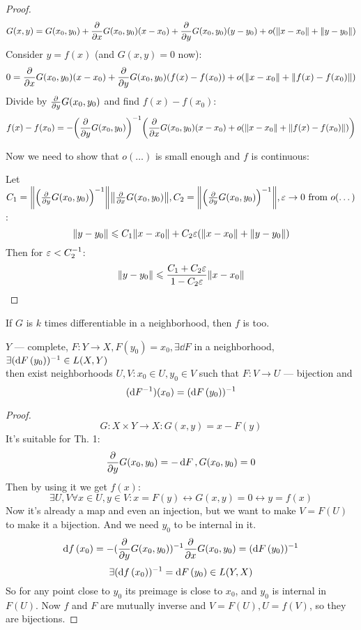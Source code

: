 \begin{proof}
    \[ G(x, y) = G(x_0, y_0) + \pdv{x}G(x_0, y_0)(x-x_0) + \pdv{y}G(x_0, y_0)(y - y_0) + o\qty(\norm{x - x_0} + \norm{y - y_0}) \]
    Consider $y = f(x)$ (and $G(x, y) = 0$ now):
    \[ 0 = \pdv{x}G(x_0, y_0)(x-x_0) + \pdv{y}G(x_0, y_0)\qty(f(x) - f(x_0)) + o\qty(\norm{x - x_0} + \norm{f(x) - f(x_0)}) \] 
    Divide by $\pdv{y}G(x_0, y_0)$ and find $f(x) - f(x_0)$:
    \[ f(x) - f(x_0) = -\qty(\pdv{y}G(x_0, y_0))^{-1} \qty(\pdv{x}G(x_0, y_0) (x - x_0) + o\qty(\norm{x - x_0} + \norm{f(x) - f(x_0)})) \] 

    Now we need to show that $o(\dots)$ is small enough and $f$ is continuous:

    Let $C_1 = \norm{\qty(\pdv{y}G(x_0, y_0))^{-1}} \norm{\pdv{x}G(x_0, y_0)}, C_2 = \norm{\qty(\pdv{y}G(x_0, y_0))^{-1}}, \varepsilon \to 0 \text{ from } o(\dots)$:
    \[ \norm{y - y_0} \leqslant C_1 \norm{x - x_0} + C_2 \varepsilon \qty(\norm{x - x_0} + \norm{y - y_0}) \] 
    Then for $\varepsilon < C_2^{-1}$:
    \[ \norm{y - y_0} \leqslant \frac{C_1 + C_2 \varepsilon}{1 - C_2 \varepsilon} \norm{x - x_0} \]
\end{proof}

\begin{thr}[Corollary] 
    If $G$ is $k$ times differentiable in a neighborhood, then $f$ is too.
\end{thr}

\begin{thr}
    $Y$ --- complete, $F: Y \to X, F(y_0) = x_0, \exists \dd{F}$ in a neighborhood, $\exists (\dd{F}\/(y_0))^{-1} \in L(X, Y)$ \\ 
    then exist neighborhoods $U, V: x_0 \in U, y_0 \in V$ such that $F: V \to U$ --- bijection and
    \[ (\dd{F^{-1}})(x_0) = (\dd{F}\/(y_0))^{-1} \]  
\end{thr}
\begin{proof}
    \[ G: X \times Y \to X: G(x, y) = x - F(y) \]
    It's suitable for Th. 1:
    \[ \pdv{y} G\/(x_0, y_0) = -\dd{F}, G(x_0, y_0) = 0 \]
    Then by using it we get $f(x)$:
    \[ \exists U, V \forall x \in U, y \in V : x = F(y) \leftrightarrow G(x, y) = 0 \leftrightarrow y = f(x) \]
    Now it's already a map and even an injection, but we want to make $V = F(U)$ to make it a bijection. And we need $y_0$ to be internal in it.
    \[ \dd{f}\/(x_0) = -(\pdv{y} G(x_0, y_0))^{-1} \pdv{x}\/G(x_0, y_0) = (\dd{F}\/(y_0))^{-1} \]
    \[ \exists (\dd{f}\/(x_0))^{-1} = \dd{F}\/(y_0) \in L(Y, X) \] 
    So for any point close to $y_0$ its preimage is close to $x_0$, and $y_0$ is internal in $F(U)$.
    Now $f$ and $F$ are mutually inverse and $V = F(U), U = f(V)$, so they are bijections.
\end{proof}

